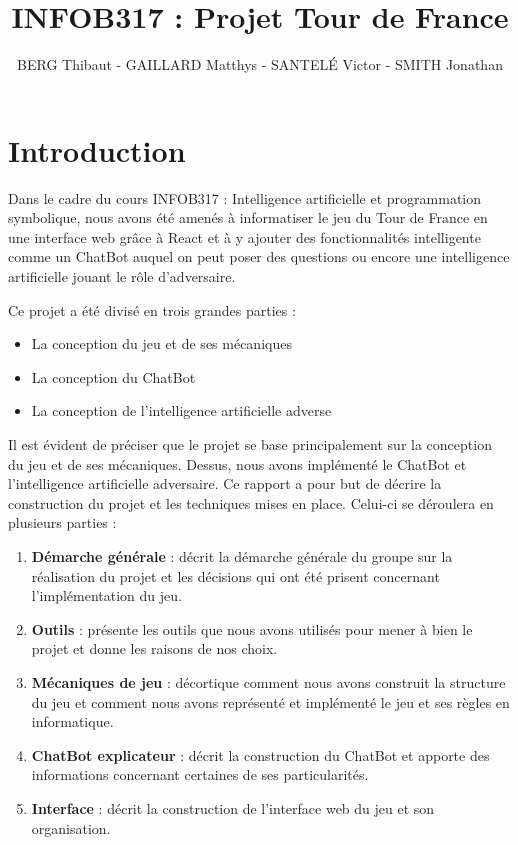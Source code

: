 \documentclass[a4paper, 11pt]{article}
\title{INFOB317 : Projet Tour de France}
\author{BERG Thibaut - GAILLARD Matthys - SANTELÉ Victor - SMITH Jonathan}
\begin{document}
\maketitle

\newpage

\section{Introduction}

Dans le cadre du cours INFOB317 : Intelligence artificielle et programmation symbolique, nous avons été amenés à informatiser le jeu du Tour de France en une interface web grâce à React et à y ajouter des fonctionnalités intelligente comme un ChatBot auquel on peut poser des questions ou encore une intelligence artificielle jouant le rôle d'adversaire.\newline

Ce projet a été divisé en trois grandes parties :
\begin{itemize}
    \item La conception du jeu et de ses mécaniques
    \item La conception du ChatBot
    \item La conception de l'intelligence artificielle adverse\newline
\end{itemize}

Il est évident de préciser que le projet se base principalement sur la conception du jeu et de ses mécaniques. Dessus, nous avons implémenté le ChatBot et l'intelligence artificielle adversaire. Ce rapport a pour but de décrire la construction du projet et les techniques mises en place. Celui-ci se déroulera en plusieurs parties : 

\begin{enumerate}
	\item \textbf{Démarche générale} : décrit la démarche générale du groupe sur la réalisation du projet et les décisions qui ont été prisent concernant l'implémentation du jeu.
	\item \textbf{Outils} : présente les outils que nous avons utilisés pour mener à bien le projet et donne les raisons de nos choix.
	\item \textbf{Mécaniques de jeu} : décortique comment nous avons construit la structure du jeu et comment nous avons représenté et implémenté le jeu et ses règles en informatique.
	\item \textbf{ChatBot explicateur} : décrit la construction du ChatBot et apporte des informations concernant certaines de ses particularités.
	\item \textbf{Interface} : décrit la construction de l'interface web du jeu et son organisation.
\end{enumerate}
\end{document}
